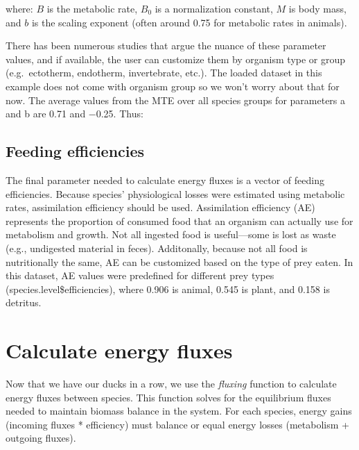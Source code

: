 \documentclass[
]{article}
\newenvironment{Shaded}{\begin{snugshade}}{\end{snugshade}}
\newcommand{\CommentTok}[1]{\textcolor[rgb]{0.56,0.35,0.01}{\textit{#1}}}
\newcommand{\FloatTok}[1]{\textcolor[rgb]{0.00,0.00,0.81}{#1}}
\newcommand{\NormalTok}[1]{#1}
\newcommand{\OtherTok}[1]{\textcolor[rgb]{0.56,0.35,0.01}{#1}}
\newcommand{\SpecialCharTok}[1]{\textcolor[rgb]{0.81,0.36,0.00}{\textbf{#1}}}
\begin{document}
where: \(B\) is the metabolic rate, \(B_0\) is a normalization constant,
\(M\) is body mass, and \(b\) is the scaling exponent (often around 0.75
for metabolic rates in animals).

There has been numerous studies that argue the nuance of these parameter
values, and if available, the user can customize them by organism type
or group (e.g.~ectotherm, endotherm, invertebrate, etc.). The loaded
dataset in this example does not come with organism group so we won't
worry about that for now. The average values from the MTE over all
species groups for parameters a and b are 0.71 and −0.25. Thus:

\begin{Shaded}
\end{Shaded}

\subsection{Feeding efficiencies}\label{feeding-efficiencies}

The final parameter needed to calculate energy fluxes is a vector of
feeding efficiencies. Because species' physiological losses were
estimated using metabolic rates, assimilation efficiency should be used.
Assimilation efficiency (AE) represents the proportion of consumed food
that an organism can actually use for metabolism and growth. Not all
ingested food is useful---some is lost as waste (e.g., undigested
material in feces). Additonally, because not all food is nutritionally
the same, AE can be customized based on the type of prey eaten. In this
dataset, AE values were predefined for different prey types
(species.level\$efficiencies), where 0.906 is animal, 0.545 is plant,
and 0.158 is detritus.

\section{Calculate energy fluxes}\label{calculate-energy-fluxes}

Now that we have our ducks in a row, we use the \emph{fluxing} function
to calculate energy fluxes between species. This function solves for the
equilibrium fluxes needed to maintain biomass balance in the system. For
each species, energy gains (incoming fluxes * efficiency) must balance
or equal energy losses (metabolism + outgoing fluxes).
\end{document}
